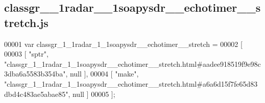 \subsection{classgr\+\_\+\_\+1radar\+\_\+\_\+1soapysdr\+\_\+\+\_\+echotimer\+\_\+\+\_\+stretch.\+js}
\label{classgr__1__1radar__1__1soapysdr____echotimer____stretch_8js_source}

\begin{DoxyCode}
00001 var classgr_1_1radar_1_1soapysdr__echotimer__stretch =
00002 [
00003     [ \textcolor{stringliteral}{"sptr"}, \textcolor{stringliteral}{"classgr\_1\_1radar\_1\_1soapysdr\_\_echotimer\_\_stretch.html#aadee918519f9e98c3dba6a5583b354ba"}, 
      null ],
00004     [ \textcolor{stringliteral}{"make"}, \textcolor{stringliteral}{"classgr\_1\_1radar\_1\_1soapysdr\_\_echotimer\_\_stretch.html#a6a6d15f7fe65d83dbd4c483ae5abae85"}, 
      null ]
00005 ];
\end{DoxyCode}
